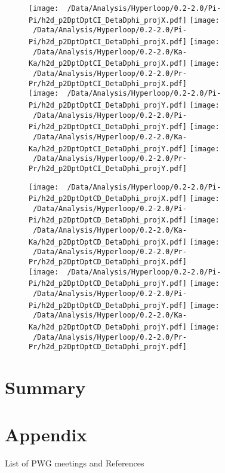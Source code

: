 \documentclass[ALICE,manyauthors]{ALICE_analysis_notes}
\begin{document}
\begin{figure}[h!]
	\hfill
	\centering
	\texttt{[image: ~/Data/Analysis/Hyperloop/0.2-2.0/Pi-Pi/h2d\_p2DptDptCI\_DetaDphi\_projX.pdf]}
	\texttt{[image: ~/Data/Analysis/Hyperloop/0.2-2.0/Pi-Pi/h2d\_p2DptDptCI\_DetaDphi\_projX.pdf]}
	\texttt{[image: ~/Data/Analysis/Hyperloop/0.2-2.0/Ka-Ka/h2d\_p2DptDptCI\_DetaDphi\_projX.pdf]}
	\texttt{[image: ~/Data/Analysis/Hyperloop/0.2-2.0/Pr-Pr/h2d\_p2DptDptCI\_DetaDphi\_projX.pdf]}
	\\
	\hfill
	\centering
	\texttt{[image: ~/Data/Analysis/Hyperloop/0.2-2.0/Pi-Pi/h2d\_p2DptDptCI\_DetaDphi\_projY.pdf]}
	\texttt{[image: ~/Data/Analysis/Hyperloop/0.2-2.0/Pi-Pi/h2d\_p2DptDptCI\_DetaDphi\_projY.pdf]}
	\texttt{[image: ~/Data/Analysis/Hyperloop/0.2-2.0/Ka-Ka/h2d\_p2DptDptCI\_DetaDphi\_projY.pdf]}
	\texttt{[image: ~/Data/Analysis/Hyperloop/0.2-2.0/Pr-Pr/h2d\_p2DptDptCI\_DetaDphi\_projY.pdf]}
\end{figure}
\begin{figure}[h!]
	\hfill
	\centering
	\texttt{[image: ~/Data/Analysis/Hyperloop/0.2-2.0/Pi-Pi/h2d\_p2DptDptCD\_DetaDphi\_projX.pdf]}
	\texttt{[image: ~/Data/Analysis/Hyperloop/0.2-2.0/Pi-Pi/h2d\_p2DptDptCD\_DetaDphi\_projX.pdf]}
	\texttt{[image: ~/Data/Analysis/Hyperloop/0.2-2.0/Ka-Ka/h2d\_p2DptDptCD\_DetaDphi\_projX.pdf]}
	\texttt{[image: ~/Data/Analysis/Hyperloop/0.2-2.0/Pr-Pr/h2d\_p2DptDptCD\_DetaDphi\_projX.pdf]}
	\\
	\hfill
	\centering
	\texttt{[image: ~/Data/Analysis/Hyperloop/0.2-2.0/Pi-Pi/h2d\_p2DptDptCD\_DetaDphi\_projY.pdf]}
	\texttt{[image: ~/Data/Analysis/Hyperloop/0.2-2.0/Pi-Pi/h2d\_p2DptDptCD\_DetaDphi\_projY.pdf]}
	\texttt{[image: ~/Data/Analysis/Hyperloop/0.2-2.0/Ka-Ka/h2d\_p2DptDptCD\_DetaDphi\_projY.pdf]}
	\texttt{[image: ~/Data/Analysis/Hyperloop/0.2-2.0/Pr-Pr/h2d\_p2DptDptCD\_DetaDphi\_projY.pdf]}
\end{figure}

\section{Summary}
\section{Appendix}
List of PWG meetings and References
%
\end{document}
